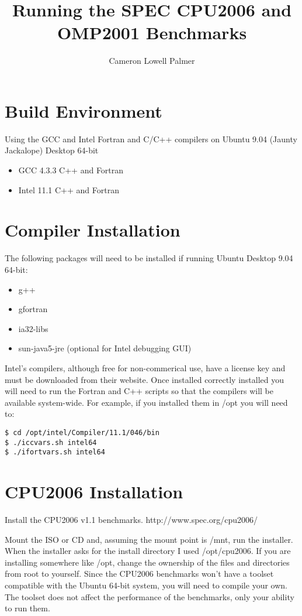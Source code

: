 \documentclass[12pt,twoside,a4paper]{article}
\title{Running the SPEC CPU2006 and OMP2001 Benchmarks}
\author{Cameron Lowell Palmer}
\begin{document}
\maketitle
\section{Build Environment}
Using the GCC and Intel Fortran and C/C++ compilers on Ubuntu 9.04 (Jaunty Jackalope) Desktop 64-bit

\begin{itemize}
\item GCC 4.3.3 C++ and Fortran
\item Intel 11.1 C++ and Fortran
\end{itemize}

\section{Compiler Installation}
The following packages will need to be installed if running Ubuntu Desktop 9.04 64-bit:
\begin{itemize}
\item g++
\item gfortran
\item ia32-libs
\item sun-java5-jre (optional for Intel debugging GUI)
\end{itemize}

Intel's compilers, although free for non-commerical use, have a license key and must be downloaded from their website. Once installed correctly installed you will need to run the Fortran and C++ scripts so that the compilers will be available system-wide. For example, if you installed them in /opt you will need to:
\begin{lstlisting}
$ cd /opt/intel/Compiler/11.1/046/bin
$ ./iccvars.sh intel64
$ ./ifortvars.sh intel64
\end{lstlisting}


\section{CPU2006 Installation}
Install the CPU2006 v1.1 benchmarks. http://www.spec.org/cpu2006/

Mount the ISO or CD and, assuming the mount point is /mnt, run the installer. When the installer asks for the install directory I used /opt/cpu2006. If you are installing somewhere like /opt, change the ownership of the files and directories from root to yourself. Since the CPU2006 benchmarks won't have a toolset compatible with the Ubuntu 64-bit system, you will need to compile your own. The toolset does not affect the performance of the benchmarks, only your ability to run them.
\end{document}
